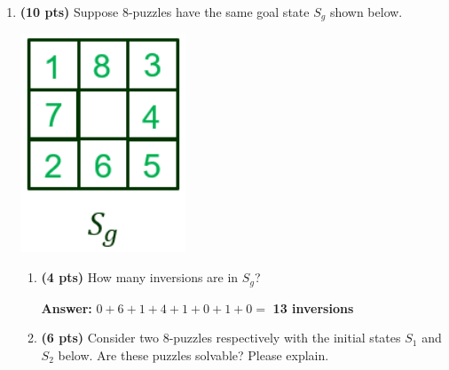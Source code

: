 \documentclass{article}
\begin{document}
\begin{enumerate}

\item \textbf{(10 pts)} Suppose 8-puzzles have the same goal state $S_g$ shown below.

\begin{center}
    \includegraphics[scale=0.75]{472-PS1-Q3-Sg.png}
\end{center}

\begin{enumerate}[label=($\alph*$)]
    
    
    \item \textbf{(4 pts)} How many inversions are in $S_g$?

    \color{blue}\textbf{Answer:} $0+6+1+4+1+0+1+0 =$ \textbf{13 inversions} \color{black}



    \item \textbf{(6 pts)} Consider two 8-puzzles respectively with the initial states $S_1$ and $S_2$ below. Are these puzzles solvable? Please explain.


\end{enumerate}
\end{enumerate}
\end{document}
